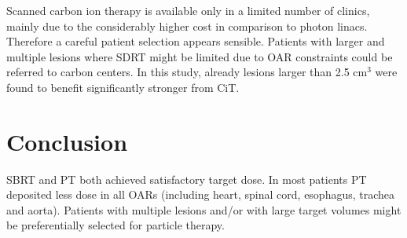 Scanned carbon ion therapy is available only in a limited number of clinics, mainly due to the considerably higher cost in comparison to photon linacs.
Therefore a careful patient selection appears sensible. Patients with larger and multiple lesions where SDRT might be limited due to OAR constraints 
could be referred to carbon centers. In this study, already lesions larger than 2.5 cm$^3$ were found to benefit significantly stronger from CiT.

\section{Conclusion}
SBRT and PT both achieved satisfactory target dose. In most patients PT deposited less dose in all OARs (including heart, spinal cord, esophagus, trachea and aorta). Patients with multiple lesions and/or with large target volumes might be preferentially selected for particle therapy.
